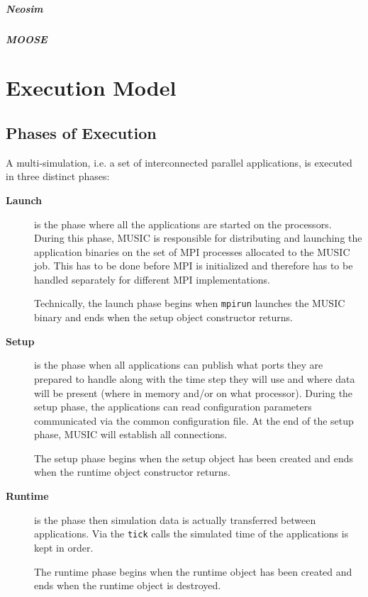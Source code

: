 \documentclass[a4paper]{report}
\begin{document}
\begin{metatext}
\paragraph{Neosim}

\paragraph{MOOSE}
\end{metatext}

\chapter{Execution Model}

\section{Phases of Execution}

A multi-simulation, i.e. a set of interconnected parallel
applications, is executed in three distinct phases:
\begin{description}
\item[\textbf{Launch}] is the phase where all the
  applications are started on the processors.  During this phase,
  MUSIC is responsible for distributing and launching the application
  binaries on the set of MPI processes allocated to the MUSIC job.
  This has to be done before MPI is initialized and therefore has to
  be handled separately for different MPI implementations.

  Technically, the launch phase begins when \texttt{mpirun} launches
  the MUSIC binary and ends when the setup object constructor returns.

\item[\textbf{Setup}] is the phase when all
  applications can publish what ports they are prepared to handle
  along with the time step they will use and where data will be
  present (where in memory and/or on what processor).  During the
  setup phase, the applications can read configuration parameters
  communicated via the common configuration file.  At the end of the
  setup phase, MUSIC will establish all connections.

  The setup phase begins when the setup object has been created and
  ends when the runtime object constructor returns.

\item[\textbf{Runtime}] is the phase then
  simulation data is actually transferred between applications.  Via
  the \texttt{tick} calls the simulated time of the applications is
  kept in order.

  The runtime phase begins when the runtime object has been created
  and ends when the runtime object is destroyed.
\end{description}
\end{document}
